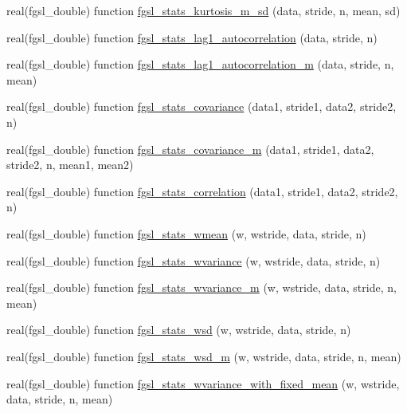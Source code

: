 \begin{DoxyCompactItemize}
\item 
real(fgsl\-\_\-double) function \hyperlink{statistics_8finc_a73f37fa7fc26bbc32b2ec4f430ff4237}{fgsl\-\_\-stats\-\_\-kurtosis\-\_\-m\-\_\-sd} (data, stride, n, mean, sd)
\item 
real(fgsl\-\_\-double) function \hyperlink{statistics_8finc_aec9e1868404363cdd4071d759452dffa}{fgsl\-\_\-stats\-\_\-lag1\-\_\-autocorrelation} (data, stride, n)
\item 
real(fgsl\-\_\-double) function \hyperlink{statistics_8finc_ab2de33bfbff99ba0e1519a92ffc2a198}{fgsl\-\_\-stats\-\_\-lag1\-\_\-autocorrelation\-\_\-m} (data, stride, n, mean)
\item 
real(fgsl\-\_\-double) function \hyperlink{statistics_8finc_abe8b984e22ce9662518b3058c5ed3fc9}{fgsl\-\_\-stats\-\_\-covariance} (data1, stride1, data2, stride2, n)
\item 
real(fgsl\-\_\-double) function \hyperlink{statistics_8finc_a022a3337d746efe8ba47bb7b790978a9}{fgsl\-\_\-stats\-\_\-covariance\-\_\-m} (data1, stride1, data2, stride2, n, mean1, mean2)
\item 
real(fgsl\-\_\-double) function \hyperlink{statistics_8finc_ad641fcad25f9ad39af269073822f3700}{fgsl\-\_\-stats\-\_\-correlation} (data1, stride1, data2, stride2, n)
\item 
real(fgsl\-\_\-double) function \hyperlink{statistics_8finc_ac44e8f61b5d6ece8de2c7859c7324df9}{fgsl\-\_\-stats\-\_\-wmean} (w, wstride, data, stride, n)
\item 
real(fgsl\-\_\-double) function \hyperlink{statistics_8finc_a7369e6ff86c963b93045d041e0318b37}{fgsl\-\_\-stats\-\_\-wvariance} (w, wstride, data, stride, n)
\item 
real(fgsl\-\_\-double) function \hyperlink{statistics_8finc_a58b0acc505557f72f2cfc2813e945666}{fgsl\-\_\-stats\-\_\-wvariance\-\_\-m} (w, wstride, data, stride, n, mean)
\item 
real(fgsl\-\_\-double) function \hyperlink{statistics_8finc_a07bed243844c213b933de5274daa9116}{fgsl\-\_\-stats\-\_\-wsd} (w, wstride, data, stride, n)
\item 
real(fgsl\-\_\-double) function \hyperlink{statistics_8finc_a9be620d1825095d70f5a3eb93f1e8304}{fgsl\-\_\-stats\-\_\-wsd\-\_\-m} (w, wstride, data, stride, n, mean)
\item 
real(fgsl\-\_\-double) function \hyperlink{statistics_8finc_a6106f2ae69fddefef4d5e233e54a8df0}{fgsl\-\_\-stats\-\_\-wvariance\-\_\-with\-\_\-fixed\-\_\-mean} (w, wstride, data, stride, n, mean)
\item 

\end{DoxyCompactItemize}
